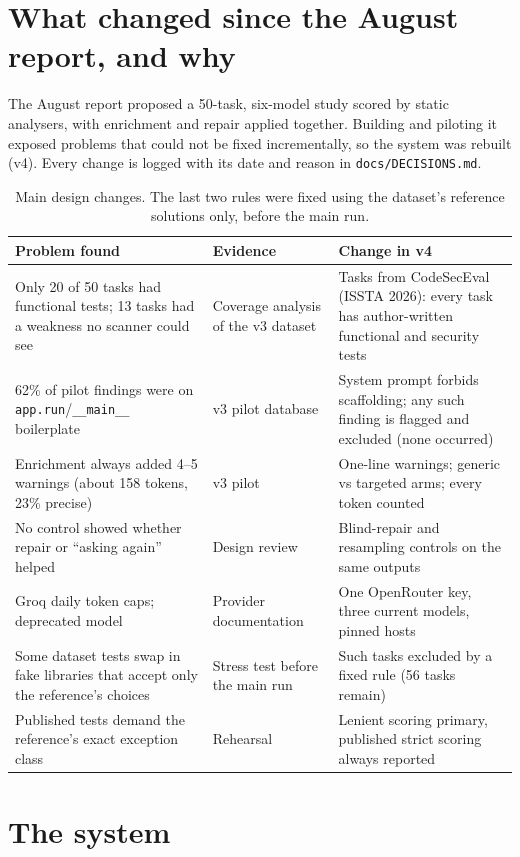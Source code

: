 \documentclass[11pt]{article}
\begin{document}
\section{What changed since the August report, and why}
The August report proposed a 50-task, six-model study scored by static analysers, with enrichment and repair
applied together. Building and piloting it exposed problems that could not be fixed incrementally, so the system
was rebuilt (v4). Every change is logged with its date and reason in \texttt{docs/DECISIONS.md}.

\begin{table}[H]\centering\small
\begin{tabular}{p{4.3cm}p{5.2cm}p{5.5cm}}
\toprule
Problem found & Evidence & Change in v4\\
\midrule
Only 20 of 50 tasks had functional tests; 13 tasks had a weakness no scanner could see &
Coverage analysis of the v3 dataset & Tasks from CodeSecEval (ISSTA 2026): every task has author-written functional
and security tests\\
62\% of pilot findings were on \texttt{app.run}/\texttt{\_\_main\_\_} boilerplate &
v3 pilot database & System prompt forbids scaffolding; any such finding is flagged and excluded (none occurred)\\
Enrichment always added 4--5 warnings (about 158 tokens, 23\% precise) &
v3 pilot & One-line warnings; generic vs targeted arms; every token counted\\
No control showed whether repair or ``asking again'' helped &
Design review & Blind-repair and resampling controls on the same outputs\\
Groq daily token caps; deprecated model &
Provider documentation & One OpenRouter key, three current models, pinned hosts\\
Some dataset tests swap in fake libraries that accept only the reference's choices &
Stress test before the main run & Such tasks excluded by a fixed rule (56 tasks remain)\\
Published tests demand the reference's exact exception class &
Rehearsal & Lenient scoring primary, published strict scoring always reported\\
\bottomrule
\end{tabular}
\caption{Main design changes. The last two rules were fixed using the dataset's reference solutions only, before
the main run.}
\end{table}

\section{The system}
\end{document}
